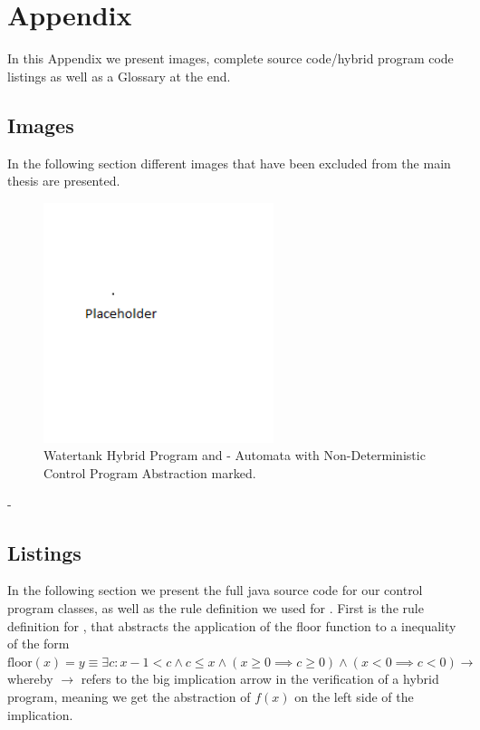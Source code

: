 


\chapter{Appendix}
\label{chap:appendix}
In this Appendix we present images, complete source code/hybrid program code listings as well as a Glossary at the end.

\section{Images}
\label{app:sec:images}

In the following section different images that have been excluded from the main thesis are presented.

	\begin{figure}[h!]
		\centering
		\includegraphics[height=0.5\textheight,width=0.6\textwidth]{Images/ex_control}
		\caption{Watertank Hybrid Program and - Automata with Non-Deterministic Control Program Abstraction marked.}
		\label{fig:ex_control}
	\end{figure}
-

\section{Listings}
\label{app:sec:listings}

In the following section we present the full java source code for our control program classes, as well as the rule definition we used for \keym. First is the rule definition for \keym, that abstracts the application of the floor function to a inequality of the form \(\textrm{floor}(x) = y \equiv \exists c:x-1 < c \wedge c \leq x \wedge (x \geq 0 \implies c \geq 0) \wedge (x < 0 \implies c < 0)  \longrightarrow\) whereby \(\longrightarrow\) refers to the big implication arrow in the verification of a hybrid program, meaning we get the abstraction of \(f(x)\) on the left side of the implication.

